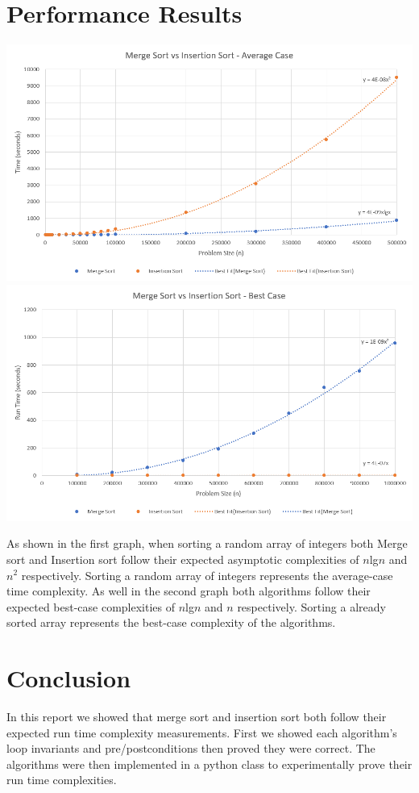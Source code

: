 \documentclass[a4paper]{article}
\begin{document}
    \section{Performance Results}
    \includegraphics[scale=0.75]{Average}\\

    \includegraphics[scale=0.75]{Best}
    
    \vspace{1cm}
    As shown in the first graph, when sorting a random array of integers both Merge
    sort and Insertion sort follow their expected asymptotic complexities of $n$lg$n$
    and $n^{2}$ respectively. Sorting a random array of integers represents the 
    average-case time complexity. As well in the second graph both algorithms follow their 
    expected best-case complexities of $n$lg$n$ and $n$ respectively. Sorting a already 
    sorted array represents the best-case complexity of the algorithms.

    \section{Conclusion}
    In this report we showed that merge sort and insertion sort both follow their expected
    run time complexity measurements. First we showed each algorithm's loop invariants 
    and pre/postconditions then proved they were correct. The algorithms were then
    implemented in a python class to experimentally prove their run time complexities.
\end{document}
